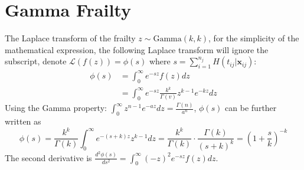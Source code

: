 \documentclass[preprint,12pt]{elsarticle}
\begin{document}
\section{Gamma Frailty} 
The Laplace transform of the frailty $z\sim\text{Gamma}(k, k)$, for the simplicity of the mathematical expression, the following Laplace transform will ignore the subscript, denote $\mathscr{L}(f(z))=\phi(s)$ where $s=\sum_{i=1}^{n_j}H(t_{ij}|\mathbf{x}_{ij})$:
\begin{align}
    \phi(s)&=\int_0^{\infty}e^{-sz}f(z)dz\\
    &=\int_0^{\infty}e^{-sz}\frac{k^k}{\Gamma(v)}z^{k-1}e^{-kz}dz
\end{align}
Using the Gamma property: $\int_0^{\infty}z^{n-1}e^{-az}dz=\frac{\Gamma(n)}{a^n}$, $\phi(s)$ can be further written as
\begin{equation}
    \phi(s)=\frac{k^k}{\Gamma(k)}\int_0^{\infty}e^{-(s+k)z}z^{k-1}dz=\frac{k^k}{\Gamma(k)}\cdot \frac{\Gamma(k)}{(s+k)^k}=(1+\frac{s}{k})^{-k}
\end{equation}
The second derivative is $\frac{d^2\phi(s)}{ds^2}=\int_0^{\infty}(-z)^2e^{-sz}f(z)dz$. 
\end{document}

